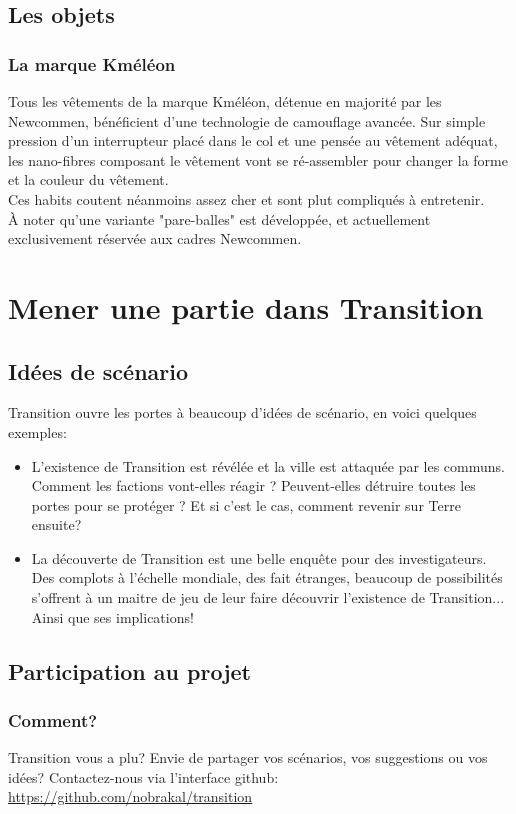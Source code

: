 \documentclass{book}
\begin{document}
\section{Les objets}
\subsection{La marque Kméléon}
Tous les vêtements de la marque Kméléon, détenue en majorité par les Newcommen, bénéficient d'une technologie de camouflage avancée. Sur simple pression d'un interrupteur placé dans le col et une pensée au vêtement adéquat, les nano-fibres composant le vêtement vont se ré-assembler pour changer la forme et la couleur du vêtement.\\
Ces habits coutent néanmoins assez cher et sont plut compliqués à entretenir.\\
À noter qu'une variante "pare-balles" est développée, et actuellement exclusivement réservée aux cadres Newcommen. 

\chapter{Mener une partie dans Transition}
\section{Idées de scénario}
Transition ouvre les portes à beaucoup d'idées de scénario, en voici quelques exemples:
\begin{itemize}
	\item L'existence de Transition est révélée et la ville est attaquée par les communs. Comment les factions vont-elles réagir ? Peuvent-elles détruire toutes les portes pour se protéger ? Et si c'est le cas, comment revenir sur Terre ensuite?
	\item La découverte de Transition est une belle enquête pour des investigateurs. Des complots à l'échelle mondiale, des fait étranges, beaucoup de possibilités s'offrent à un maitre de jeu de leur faire découvrir l'existence de Transition... Ainsi que ses implications!
\end{itemize}

\newpage
\section{Participation au projet}
\subsection{Comment?}
\hypertarget{participation}{}
Transition vous a plu? 
Envie de partager vos scénarios, vos suggestions ou vos idées?
\newline
Contactez-nous via l'interface github: \href {https://github.com/nobrakal/transition} {https://github.com/nobrakal/transition}
\end{document}
